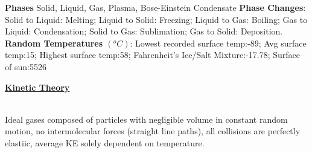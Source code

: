 \documentclass{article}
\begin{document}
\begin{multicols*}{3}{}
\textbf{Phases} Solid, Liquid, Gas, Plasma, Bose-Einstein Condensate \textbf{Phase Changes}: Solid to Liquid: Melting; Liquid to Solid: Freezing; Liquid to Gas: Boiling; Gas to Liquid: Condensation; Solid to Gas: Sublimation; Gas to Solid: Deposition. \textbf{Random Temperatures $(^{o}C)$}: Lowest recorded surface temp:-89; Avg surface temp:15; Highest surface temp:58; Fahrenheit's Ice/Salt Mixture:-17.78; Surface of sun:5526
\\
\begin{small}
\textbf{\underline{Kinetic Theory}}
\end{small}
\\
Ideal gases composed of particles with negligible   volume in constant random motion, no intermolecular forces (straight line paths), all collisions are perfectly elastiic, average KE solely dependent on temperature.\\


\end{multicols*}
\end{document}
